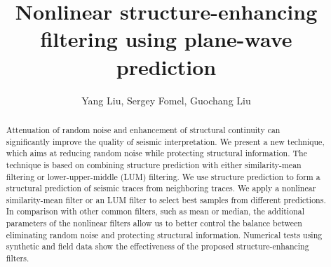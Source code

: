 
%

\title{Nonlinear structure-enhancing filtering using plane-wave prediction}

\renewcommand{\thefootnote}{\fnsymbol{footnote}}


\address{
\footnotemark[1] College of Geo-Exploration Science and Technology,\\
Jilin University \\
No.6 Xi minzhu street, \\
Changchun, China, 130026 \\
\footnotemark[2] Bureau of Economic Geology,\\
John A. and Katherine G. Jackson School of Geosciences \\
The University of Texas at Austin \\
University Station, Box X \\
Austin, TX, USA, 78713-8924 \\
\footnotemark[3] State Key Laboratory of Petroleum Resource and Prospecting,\\
China University of Petroleum-Beijing \\
18 Fuxue road, Changping, \\
Beijing, China, 102249 }

\author{Yang Liu\footnotemark[1]\footnotemark[2], Sergey Fomel\footnotemark[2], 
        Guochang Liu\footnotemark[3]}

\maketitle

\begin{abstract}

Attenuation of random noise and enhancement of structural continuity
can significantly improve the quality of seismic interpretation. We
present a new technique, which aims at reducing random noise while
protecting structural information. The technique is based on combining
structure prediction with either similarity-mean filtering or
lower-upper-middle (LUM) filtering. We use structure prediction to
form a structural prediction of seismic traces from neighboring
traces. We apply a nonlinear similarity-mean filter or an LUM filter
to select best samples from different predictions. In comparison with
other common filters, such as mean or median, the additional
parameters of the nonlinear filters allow us to better control the
balance between eliminating random noise and protecting structural
information. Numerical tests using synthetic and field data show the
effectiveness of the proposed structure-enhancing filters.

\end{abstract}

